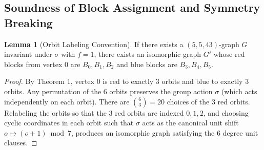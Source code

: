 \documentclass[11pt,a4paper]{article}
\theoremstyle{definition}
\newtheorem{lemma}{Lemma}
\begin{document}
\subsection{Soundness of Block Assignment and Symmetry Breaking}

\begin{lemma}[Orbit Labeling Convention]
\label{lem:block_convention}
If there exists a $(5,5,43)$-graph $G$ invariant under $\sigma$ with $f=1$, there exists an isomorphic graph $G'$ whose red blocks from vertex 0 are $B_0, B_1, B_2$ and blue blocks are $B_3, B_4, B_5$.
\end{lemma}
\begin{proof}
By Theorem 1, vertex 0 is red to exactly 3 orbits and blue to exactly 3 orbits. Any permutation of the 6 orbits preserves the group action $\sigma$ (which acts independently on each orbit). There are $\binom{6}{3} = 20$ choices of the 3 red orbits. Relabeling the orbits so that the 3 red orbits are indexed $0, 1, 2$, and choosing cyclic coordinates in each orbit such that $\sigma$ acts as the canonical unit shift $o \mapsto (o+1) \bmod 7$, produces an isomorphic graph satisfying the 6 degree unit clauses.
\end{proof}
\end{document}
